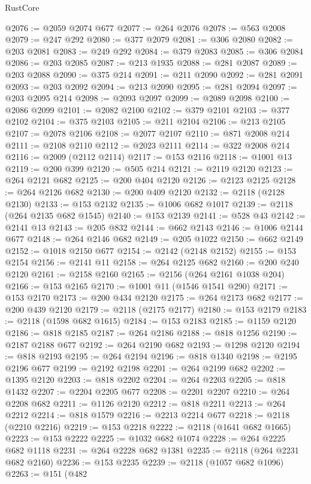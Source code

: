 \begin{lexlean}{RustCore}
\begin{coremodule}
@2076 := @2059 @2074 @677
@2077 := @264 @2076
@2078 := @563 @2008
@2079 := @247 @292
@2080 := @377 @2079
@2081 := @306 @2080
@2082 := @203 @2081
@2083 := @249 @292
@2084 := @379 @2083
@2085 := @306 @2084
@2086 := @203 @2085
@2087 := @213 @1935
@2088 := @281 @2087
@2089 := @203 @2088
@2090 := @375 @214
@2091 := @211 @2090
@2092 := @281 @2091
@2093 := @203 @2092
@2094 := @213 @2090
@2095 := @281 @2094
@2097 := @203 @2095 @214
@2098 := @2093 @2097
@2099 := @2089 @2098
@2100 := @2086 @2099
@2101 := @2082 @2100
@2102 := @379 @2101
@2103 := @377 @2102
@2104 := @375 @2103
@2105 := @211 @2104
@2106 := @213 @2105
@2107 := @2078 @2106
@2108 := @2077 @2107
@2110 := @871 @2008 @214
@2111 := @2108 @2110
@2112 := @2023 @2111
@2114 := @322 @2008 @214
@2116 := @2009 (@2112 @2114)
@2117 := @153 @2116
@2118 := @1001 @13
@2119 := @200 @399
@2120 := @505 @214
@2121 := @2119 @2120
@2123 := @264 @2121 @682
@2125 := @200 @404 @2120
@2126 := @2123 @2125
@2128 := @264 @2126 @682
@2130 := @200 @409 @2120
@2132 := @2118 (@2128 @2130)
@2133 := @153 @2132
@2135 := @1006 @682 @1017
@2139 := @2118 (@264 @2135 @682 @1545)
@2140 := @153 @2139
@2141 := @528 @43
@2142 := @2141 @13
@2143 := @205 @832
@2144 := @662 @2143
@2146 := @1006 @2144 @677
@2148 := @264 @2146 @682
@2149 := @205 @1022
@2150 := @662 @2149
@2152 := @1018 @2150 @677
@2154 := @2142 (@2148 @2152)
@2155 := @153 @2154
@2156 := @2141 @11
@2158 := @264 @2125 @682
@2160 := @200 @240 @2120
@2161 := @2158 @2160
@2165 := @2156 (@264 @2161 @1038 @204)
@2166 := @153 @2165
@2170 := @1001 @11 (@1546 @1541 @290)
@2171 := @153 @2170
@2173 := @200 @434 @2120
@2175 := @264 @2173 @682
@2177 := @200 @439 @2120
@2179 := @2118 (@2175 @2177)
@2180 := @153 @2179
@2183 := @2118 (@1598 @682 @1615)
@2184 := @153 @2183
@2185 := @1159 @2120
@2186 := @818 @2185
@2187 := @264 @2186
@2188 := @818 @1256
@2190 := @2187 @2188 @677
@2192 := @264 @2190 @682
@2193 := @1298 @2120
@2194 := @818 @2193
@2195 := @264 @2194
@2196 := @818 @1340
@2198 := @2195 @2196 @677
@2199 := @2192 @2198
@2201 := @264 @2199 @682
@2202 := @1395 @2120
@2203 := @818 @2202
@2204 := @264 @2203
@2205 := @818 @1432
@2207 := @2204 @2205 @677
@2208 := @2201 @2207
@2210 := @264 @2208 @682
@2211 := @1126 @2120
@2212 := @818 @2211
@2213 := @264 @2212
@2214 := @818 @1579
@2216 := @2213 @2214 @677
@2218 := @2118 (@2210 @2216)
@2219 := @153 @2218
@2222 := @2118 (@1641 @682 @1665)
@2223 := @153 @2222
@2225 := @1032 @682 @1074
@2228 := @264 @2225 @682 @1118
@2231 := @264 @2228 @682 @1381
@2235 := @2118 (@264 @2231 @682 @2160)
@2236 := @153 @2235
@2239 := @2118 (@1057 @682 @1096)
@2263 := @151
    (@482

\end{coremodule}
\end{lexlean}
